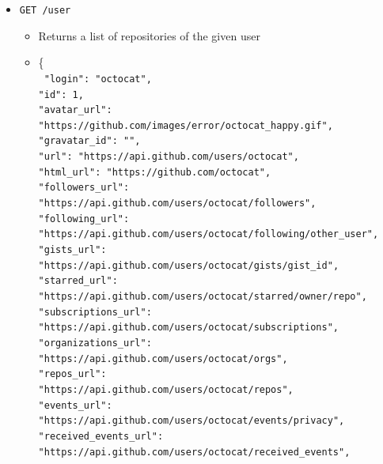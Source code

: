 \documentclass[11pt]{article}
\begin{document}
\begin{itemize}
   \item{\texttt{GET /user}}
	\begin{itemize}
	   \item{Returns a list of repositories of the given user}
	   \item{ \{\\
		\texttt{
			  \textcolor{r}{"login"}: \textcolor{b}{"octocat"},\\
			  \textcolor{r}{"id": 1},\\
			  \textcolor{r}{"avatar\_url"}: \textcolor{b}{"https://github.com/images/error/octocat\_happy.gif"},\\
			  \textcolor{r}{"gravatar\_id"}: \textcolor{b}{""},\\
			  \textcolor{r}{"url"}: \textcolor{b}{"https://api.github.com/users/octocat"},\\
			  \textcolor{r}{"html\_url"}: \textcolor{b}{"https://github.com/octocat"},\\
			  \textcolor{r}{"followers\_url"}: \\\textcolor{b}{"https://api.github.com/users/octocat/followers"},\\
			  \textcolor{r}{"following\_url"}: \\\textcolor{b}{"https://api.github.com/users/octocat/following{/other\_user}"},\\
			  \textcolor{r}{"gists\_url"}: \\\textcolor{b}{"https://api.github.com/users/octocat/gists{/gist\_id}"},\\
			  \textcolor{r}{"starred\_url"}: \\\textcolor{b}{"https://api.github.com/users/octocat/starred{/owner}{/repo}"},\\
			  \textcolor{r}{"subscriptions\_url"}: \\\textcolor{b}{"https://api.github.com/users/octocat/subscriptions"},\\
			  \textcolor{r}{"organizations\_url"}: \\\textcolor{b}{"https://api.github.com/users/octocat/orgs"},\\
			  \textcolor{r}{"repos\_url"}: \\\textcolor{b}{"https://api.github.com/users/octocat/repos"},\\
			  \textcolor{r}{"events\_url"}: \\\textcolor{b}{"https://api.github.com/users/octocat/events{/privacy}"},\\
			  \textcolor{r}{"received\_events\_url"}: \\\textcolor{b}{"https://api.github.com/users/octocat/received\_events"},\\
}}
\end{itemize}
\end{itemize}
\end{document}
